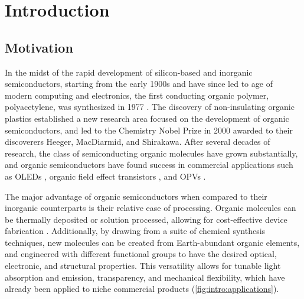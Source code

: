 
\chapter{Introduction}
\label{ch:Introduction}

\section{Motivation}



In the midst of the rapid development of silicon-based and inorganic semiconductors, starting from the early 1900s and have since led to age of modern computing and electronics, the first conducting organic polymer, polyacetylene, was synthesized in 1977 \citep{shirakawa1977synthesis,chiang1977electrical}. The discovery of non-insulating organic plastics established a new research area focused on the development of organic semiconductors, and led to the Chemistry Nobel Prize in 2000 awarded to their discoverers Heeger, MacDiarmid, and Shirakawa. After several decades of research, the class of semiconducting organic molecules have grown substantially, and organic semiconductors have found success in commercial applications such as \acp{OLED} \citep{zhu2011solution,ying2014white}, organic field effect transistors \citep{torsi2013organic,tatum2018pi}, and \acp{OPV} \citep{holliday2017recent,espinosa2015solution,gregg2003comparing,lewis2007toward}. 

The major advantage of organic semiconductors when compared to their inorganic counterparts is their relative ease of processing. Organic molecules can be thermally deposited or solution processed, allowing for cost-effective device fabrication \citep{yip2012recent,huang2019organic}. Additionally, by drawing from a suite of chemical synthesis techniques, new molecules can be created from Earth-abundant organic elements, and engineered with different functional groups to have the desired optical, electronic, and structural properties. This versatility allows for tunable light absorption and emission, transparency, and mechanical flexibility, which have already been applied to niche commercial products (\autoref{fig:intro:applications}). 

